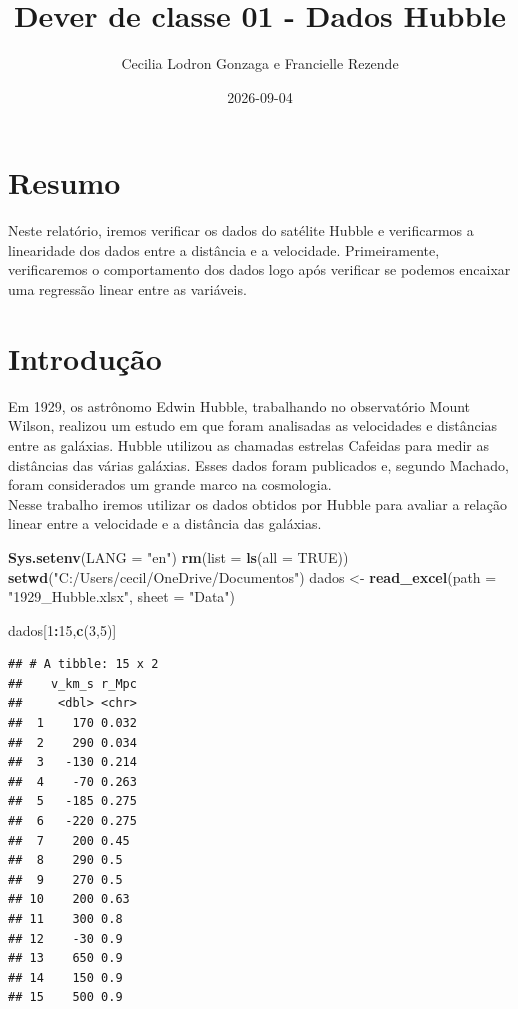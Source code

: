 \documentclass[
]{article}
\title{Dever de classe 01 - Dados Hubble}
\author{Cecilia Lodron Gonzaga e Francielle Rezende}
\date{2026-09-04}
\newenvironment{Shaded}{\begin{snugshade}}{\end{snugshade}}
\newcommand{\AttributeTok}[1]{\textcolor[rgb]{0.13,0.29,0.53}{#1}}
\newcommand{\ConstantTok}[1]{\textcolor[rgb]{0.56,0.35,0.01}{#1}}
\newcommand{\DecValTok}[1]{\textcolor[rgb]{0.00,0.00,0.81}{#1}}
\newcommand{\FunctionTok}[1]{\textcolor[rgb]{0.13,0.29,0.53}{\textbf{#1}}}
\newcommand{\NormalTok}[1]{#1}
\newcommand{\OtherTok}[1]{\textcolor[rgb]{0.56,0.35,0.01}{#1}}
\newcommand{\SpecialCharTok}[1]{\textcolor[rgb]{0.81,0.36,0.00}{\textbf{#1}}}
\newcommand{\StringTok}[1]{\textcolor[rgb]{0.31,0.60,0.02}{#1}}
\begin{document}
\maketitle

\section{Resumo}\label{resumo}

Neste relatório, iremos verificar os dados do satélite Hubble e
verificarmos a linearidade dos dados entre a distância e a velocidade.
Primeiramente, verificaremos o comportamento dos dados logo após
verificar se podemos encaixar uma regressão linear entre as variáveis.

\section{Introdução}\label{introduuxe7uxe3o}

Em 1929, os astrônomo Edwin Hubble, trabalhando no observatório Mount
Wilson, realizou um estudo em que foram analisadas as velocidades e
distâncias entre as galáxias. Hubble utilizou as chamadas estrelas
Cafeidas para medir as distâncias das várias galáxias. Esses dados foram
publicados e, segundo Machado, foram considerados um grande marco na
cosmologia.\\
Nesse trabalho iremos utilizar os dados obtidos por Hubble para avaliar
a relação linear entre a velocidade e a distância das galáxias.

\begin{Shaded}
\begin{Highlighting}[]
\FunctionTok{Sys.setenv}\NormalTok{(}\AttributeTok{LANG =} \StringTok{"en"}\NormalTok{)}
\FunctionTok{rm}\NormalTok{(}\AttributeTok{list =} \FunctionTok{ls}\NormalTok{(}\AttributeTok{all =} \ConstantTok{TRUE}\NormalTok{))}
\FunctionTok{setwd}\NormalTok{(}\StringTok{"C:/Users/cecil/OneDrive/Documentos"}\NormalTok{)}
\NormalTok{dados }\OtherTok{\textless{}{-}} \FunctionTok{read\_excel}\NormalTok{(}\AttributeTok{path =} \StringTok{"1929\_Hubble.xlsx"}\NormalTok{, }\AttributeTok{sheet =} \StringTok{"Data"}\NormalTok{)}

\NormalTok{dados[}\DecValTok{1}\SpecialCharTok{:}\DecValTok{15}\NormalTok{,}\FunctionTok{c}\NormalTok{(}\DecValTok{3}\NormalTok{,}\DecValTok{5}\NormalTok{)]}
\end{Highlighting}
\end{Shaded}

\begin{verbatim}
## # A tibble: 15 x 2
##    v_km_s r_Mpc
##     <dbl> <chr>
##  1    170 0.032
##  2    290 0.034
##  3   -130 0.214
##  4    -70 0.263
##  5   -185 0.275
##  6   -220 0.275
##  7    200 0.45 
##  8    290 0.5  
##  9    270 0.5  
## 10    200 0.63 
## 11    300 0.8  
## 12    -30 0.9  
## 13    650 0.9  
## 14    150 0.9  
## 15    500 0.9
\end{verbatim}
\end{document}
